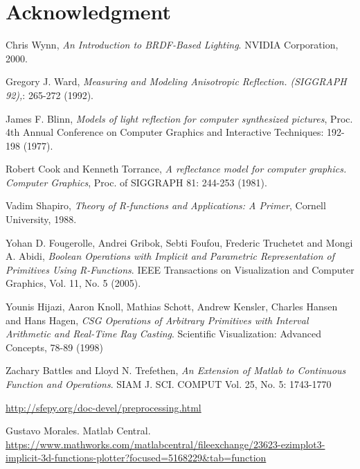 \documentclass[11pt]{amsart}
\theoremstyle{definition}
\begin{document}
\section{Acknowledgment}

\begin{thebibliography}{9}
Chris Wynn,
\emph{An Introduction to BRDF-Based Lighting}.
NVIDIA Corporation, 2000.

Gregory J. Ward, 
\emph{Measuring and Modeling Anisotropic Reflection. (SIGGRAPH 92),}: 265-272 (1992).

James F. Blinn,  
\emph{Models of light reflection for computer synthesized pictures}, Proc. 4th
Annual Conference on Computer Graphics and Interactive Techniques: 192-198
(1977). 

Robert Cook and Kenneth Torrance,
\emph{A reflectance model for computer graphics. Computer Graphics}, Proc. of SIGGRAPH 81: 244-253 (1981).  

Vadim Shapiro,
\emph{Theory of R-functions and Applications: A Primer}, Cornell University, 1988.

Yohan D. Fougerolle, Andrei Gribok, Sebti Foufou, Frederic Truchetet and Mongi A. Abidi,
\emph{Boolean Operations with Implicit and Parametric Representation of Primitives Using R-Functions}.
IEEE Transactions on Visualization and Computer Graphics, Vol. 11, No. 5 (2005).

Younis Hijazi, Aaron Knoll, Mathias Schott, Andrew Kensler, Charles Hansen and Hans Hagen,
\emph{CSG Operations of Arbitrary Primitives with Interval Arithmetic and Real-Time Ray Casting}.
Scientific Visualization: Advanced Concepts, 78-89 (1998) 
	
 
  Zachary Battles and Lloyd N. Trefethen,
  \emph{An Extension of Matlab to Continuous Function and Operations}.
  SIAM J. SCI. COMPUT Vol. 25, No. 5: 1743-1770 
 
\url{http://sfepy.org/doc-devel/preprocessing.html}

Gustavo Morales. Matlab Central.\\
\url{https://www.mathworks.com/matlabcentral/fileexchange/23623-ezimplot3-implicit-3d-functions-plotter?focused=5168229&tab=function}


	



\end{thebibliography}


%
\end{document}

